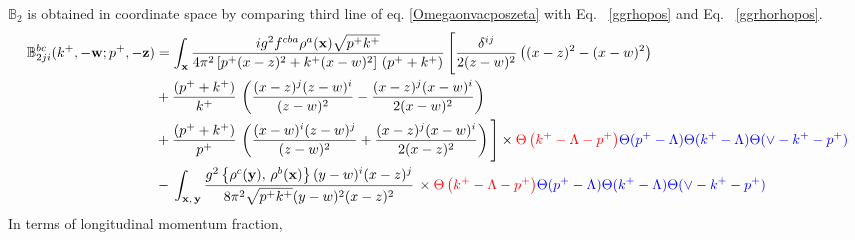 \documentclass[aps,prd,amsmath,amssymb,nofootinbib]{revtex4-2}
\def\mf#1{\mathbb{#1}}
\def\v#1{\mathbf{#1}}
\numberwithin{equation}{section}
\begin{document}
$\mf{B}_{2}$ is obtained in coordinate space by comparing third line of eq. \eqref{Omegaonvacposzeta} with Eq.~ \eqref{ggrhopos} and Eq.~ \eqref{ggrhorhopos}.
\begin{align}
     \mf{B}^{bc}_{2ji}(k^{+}, -\v{w}; p^{+}, -\v{z}) & =    \int_{\mathbf{x}}\frac{ig^{2}f^{cba}\rho^{a}(\mathbf{x})\sqrt{p^{+}k^{+}}}{4\pi^{2}\left[p^{+}(x-z)^{2}+k^{+} (x-w)^{2}\right]\,(p^{+}+k^{+})}\,\Bigg[\frac{\delta^{ij}}{2(z-w)^{2}}\left((x-z)^{2}-(x-w)^{2}\right)\notag \\ & +\frac{(p^{+}+k^{+})}{k^{+}}\,\left(\frac{(x-z)^{j}(z-w)^{i}}{(z-w)^{2}}-\frac{(x-z)^{j}(x-w)^{i}}{2(x-w)^{2}}\right)\notag \\ & +\frac{(p^{+}+k^{+})}{p^{+}}\,\left(\frac{(x-w)^{i}(z-w)^{j}}{(z-w)^{2}} +\frac{(x-z)^{j}(x-w)^{i}}{2(x-z)^{2}}\right)\Bigg]\times \textcolor{red}{\Theta\left(k^{+}-\Lambda-p^{+}\right)}\textcolor{blue}{\Theta(p^{+}-\Lambda)\Theta(k^{+}-\Lambda)\Theta(\vee-k^{+}-p^{+})} \notag \\ & -\,\int_{\mathbf{x},\,\mathbf{y}}\frac{g^{2}\left\{ \rho^{c}(\mathbf{y}),\,\rho^{b}(\mathbf{x})\right\} (y-w)^{i}(x-z)^{j}}{8\pi^{2}\sqrt{p^{+}k^{+}}(y-w)^{2}(x-z)^{2}}\,\times \textcolor{red}{\Theta\left(k^{+}-\Lambda-p^{+}\right)}\textcolor{blue}{\Theta(p^{+}-\Lambda)\Theta(k^{+}-\Lambda)\Theta(\vee-k^{+}-p^{+})}
\end{align}
In terms of longitudinal momentum fraction,
\end{document}

